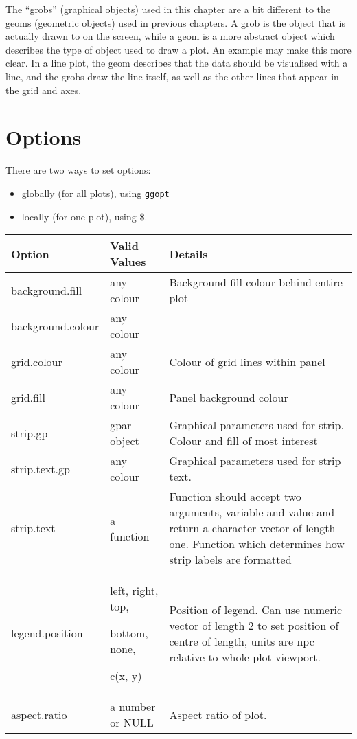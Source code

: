 The ``grobs'' (graphical objects) used in this chapter are a bit different to the geoms (geometric objects) used in previous chapters.  A grob is the object that is actually drawn to on the screen, while a geom is a more abstract object which describes the type of object used to draw a plot.  An example may make this more clear. In a line plot, the geom describes that the data should be visualised with a line, and the grobs draw the line itself, as well as the other lines that appear in the grid and axes.

\section{Options}\label{sec:options}

There are two ways to set options:

\begin{itemize}
  \item globally (for all plots), using {\tt ggopt}
  \item locally (for one plot), using \$. 
\end{itemize}     
                 
\begin{tabular}{lll}
Option & Valid Values & Details \\
\hline
background.fill    & any colour & Background fill colour behind entire plot\\
background.colour  & any colour & \\
grid.colour        & any colour & Colour of grid lines within panel \\
grid.fill          & any colour & Panel background colour \\
strip.gp           & gpar object & Graphical parameters used for strip. Colour and fill of most interest \\
strip.text.gp      & any colour & Graphical parameters used for strip text. \\
strip.text         & a function & Function should accept two arguments, variable and value and return a character vector of length one. Function which determines how strip labels are formatted \\
legend.position    & left, right, top, 

bottom, none, 

c(x, y) & Position of legend.  Can use numeric vector of length 2 to set position of centre of length, units are npc relative to whole plot viewport. \\
aspect.ratio       & a number or NULL & Aspect ratio of plot. \\
\hline
\end{tabular}

